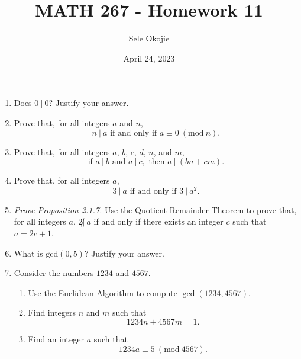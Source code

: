 \documentclass{article}
\title{MATH 267 - Homework 11}
\author{Sele Okojie}
\date{April 24, 2023}
\begin{document}
    \maketitle
    
    \begin{enumerate}

    	\item Does $0\ |\ 0$?  Justify your answer.

    	\item Prove that, for all integers $a$ and $n$,
    		\[
    			n\ |\ a \text{ if and only if } a \equiv 0\ (\mathrm{mod}\ n).
    		\]

    	\item Prove that, for all integers $a$, $b$, $c$, $d$, $n$, and $m$,
    		\[
    			\text{if } a\ |\ b \text{ and } a\ |\ c, \text{ then } a\ |\ (bn + cm).
    		\]

    	\item Prove that, for all integers $a$,
    		\[
    			3\ |\ a \text{ if and only if } 3\ |\ a^2.
    		\]

    	\item \emph{Prove Proposition 2.1.7.} Use the Quotient-Remainder Theorem to prove that, for all integers $a$, $2\not|\ a$ if and only if there exists an integer $c$ such that $a = 2c + 1$.

    	\item What is $\mathrm{gcd}(0,5)$?  Justify your answer.

    	\item Consider the numbers $1234$ and $4567$.
    		\begin{enumerate}
    			\item Use the Euclidean Algorithm to compute $\gcd(1234, 4567)$.
    			\item Find integers $n$ and $m$ such that
    				\[
    					1234n + 4567m = 1.
    				\]
    			\item Find an integer $a$ such that
    				\[
    					1234a \equiv 5 \ (\mathrm{mod}\ 4567).
    				\]
    		\end{enumerate}


\end{enumerate}
\end{document}
